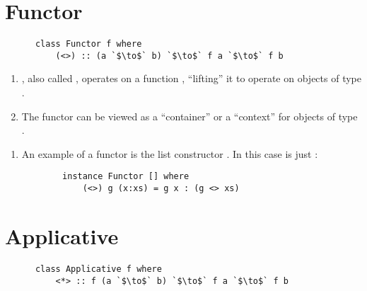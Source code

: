 \documentclass[12pt]{article}
\begin{document}
\section*{Functor}
\begin{definition*}\hspace{0pt}
  \begin{normalfont}
    \begin{verbatim}
      class Functor f where
          (<>) :: (a `$\to$` b) `$\to$` f a `$\to$` f b
    \end{verbatim}
  \end{normalfont}
\end{definition*}


\begin{remark*}\hspace{0pt}
  \begin{enumerate}
  \item \mih{(<>)}, also called , operates on a function , ``lifting''
    it to operate on objects of type .
  \item The functor  can be viewed as a ``container'' or a ``context'' for objects of type
    .
  \end{enumerate}
\end{remark*}


\begin{example*}\hspace{0pt}
  \begin{enumerate}
  \item An example of a functor is the list constructor \mih{[]}. In this case  is just
    :
    \begin{normalfont}
      \begin{verbatim}
        instance Functor [] where
            (<>) g (x:xs) = g x : (g <> xs)
      \end{verbatim}
    \end{normalfont}
  \end{enumerate}
\end{example*}


\section*{Applicative}

\begin{definition*}\hspace{0pt}
  \begin{normalfont}
    \begin{verbatim}
      class Applicative f where
          <*> :: f (a `$\to$` b) `$\to$` f a `$\to$` f b
    \end{verbatim}
  \end{normalfont}
\end{definition*}
\end{document}
